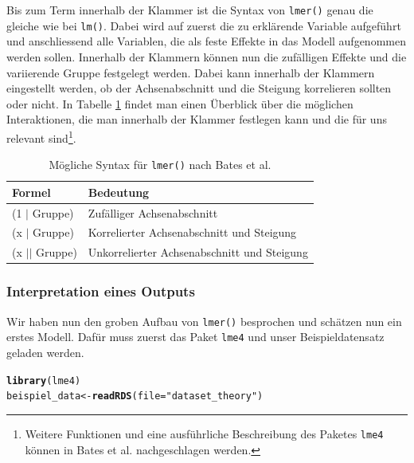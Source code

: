 \documentclass[12pt]{article}\usepackage[]{graphicx}\usepackage[]{color}
\makeatletter
\newcommand{\hlstr}[1]{\textcolor[rgb]{0.192,0.494,0.8}{#1}}%
\newcommand{\hlstd}[1]{\textcolor[rgb]{0.345,0.345,0.345}{#1}}%
\newcommand{\hlkwb}[1]{\textcolor[rgb]{0.69,0.353,0.396}{#1}}%
\newcommand{\hlkwc}[1]{\textcolor[rgb]{0.333,0.667,0.333}{#1}}%
\newcommand{\hlkwd}[1]{\textcolor[rgb]{0.737,0.353,0.396}{\textbf{#1}}}%
\newenvironment{kframe}{%
 \def\at@end@of@kframe{}%
 \ifinner\ifhmode%
  \def\at@end@of@kframe{\end{minipage}}%
  \begin{minipage}{\columnwidth}%
 \fi\fi%
 \def\FrameCommand##1{\hskip\@totalleftmargin \hskip-\fboxsep
 \colorbox{shadecolor}{##1}\hskip-\fboxsep
     \hskip-\linewidth \hskip-\@totalleftmargin \hskip\columnwidth}%
 \MakeFramed {\advance\hsize-\width
   \@totalleftmargin\z@ \linewidth\hsize
   \@setminipage}}%
 {\par\unskip\endMakeFramed%
 \at@end@of@kframe}
\newenvironment{knitrout}{}{} %
\makeatother
\begin{document}
Bis zum Term innerhalb der Klammer ist die Syntax von \texttt{lmer()} genau die gleiche wie bei \texttt{lm()}. Dabei wird auf zuerst die zu erklärende Variable aufgeführt und anschliessend alle Variablen, die als feste Effekte in das Modell aufgenommen werden sollen. Innerhalb der Klammern können nun die zufälligen Effekte und die variierende Gruppe festgelegt werden. Dabei kann innerhalb der Klammern eingestellt werden, ob der Achsenabschnitt und die Steigung korrelieren sollten oder nicht. In Tabelle \ref{tab:lmersyntax} findet man einen Überblick über die möglichen Interaktionen, die man innerhalb der Klammer festlegen kann und die für uns relevant sind\footnote{Weitere Funktionen und eine ausführliche Beschreibung des Paketes \texttt{lme4} können in Bates et al. \citeyearpar{batesetal2015lme4} nachgeschlagen werden.}.
\begin{table}[ht] 
\centering
\caption{Mögliche Syntax für \texttt{lmer()} nach Bates et al. \citeyearpar{batesetal2015lme4}}
\begin{tabular}{ll}
 	\toprule
	Formel & Bedeutung\\ 
  	\midrule
	(1 $|$ Gruppe)	& Zufälliger Achsenabschnitt \\
	(x $|$ Gruppe) & Korrelierter Achsenabschnitt und Steigung \\
	(x $||$ Gruppe) & Unkorrelierter Achsenabschnitt und Steigung\\
  	\bottomrule
\end{tabular}
\label{tab:lmersyntax}
\end{table}

\subsubsection{Interpretation eines Outputs} \label{section:interpretation_output}
Wir haben nun den groben Aufbau von \texttt{lmer()} besprochen und schätzen nun ein erstes Modell. Dafür muss zuerst das Paket \texttt{lme4} und unser Beispieldatensatz geladen werden.

\singlespacing
\begin{knitrout}
\color{fgcolor}\begin{kframe}
\begin{alltt}
\hlkwd{library}\hlstd{(lme4)}
\hlstd{beispiel_data} \hlkwb{<-} \hlkwd{readRDS}\hlstd{(}\hlkwc{file} \hlstd{=} \hlstr{"dataset_theory"}\hlstd{)}
\end{alltt}
\end{kframe}
\end{knitrout}
\end{document}

